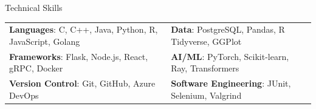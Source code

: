 \begin{resumesection}{Technical Skills}
	\begin{tabular}{ll}
		\textbf{Languages}: C, C++, Java, Python, R, JavaScript, Golang &
		\textbf{Data}: PostgreSQL, Pandas, R Tidyverse, GGPlot
		\\
		\textbf{Frameworks}: Flask, Node.js, React, gRPC, Docker        &
		\textbf{AI/ML}: PyTorch, Scikit-learn, Ray, Transformers
		\\
		\textbf{Version Control}: Git, GitHub, Azure DevOps             &
		\textbf{Software Engineering}: JUnit, Selenium, Valgrind
	\end{tabular}
\end{resumesection}
